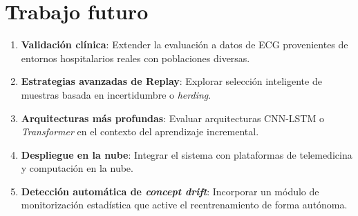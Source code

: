 \documentclass[11pt,spanish]{citedi}
\begin{document}
\section{Trabajo futuro}

\begin{enumerate}
\item \textbf{Validación clínica}: Extender la evaluación a datos de ECG provenientes de entornos hospitalarios reales con poblaciones diversas.
\item \textbf{Estrategias avanzadas de Replay}: Explorar selección inteligente de muestras basada en incertidumbre o \textit{herding}.
\item \textbf{Arquitecturas más profundas}: Evaluar arquitecturas CNN-LSTM o \textit{Transformer} en el contexto del aprendizaje incremental.
\item \textbf{Despliegue en la nube}: Integrar el sistema con plataformas de telemedicina y computación en la nube.
\item \textbf{Detección automática de \textit{concept drift}}: Incorporar un módulo de monitorización estadística que active el reentrenamiento de forma autónoma.
\end{enumerate}



\end{document}
